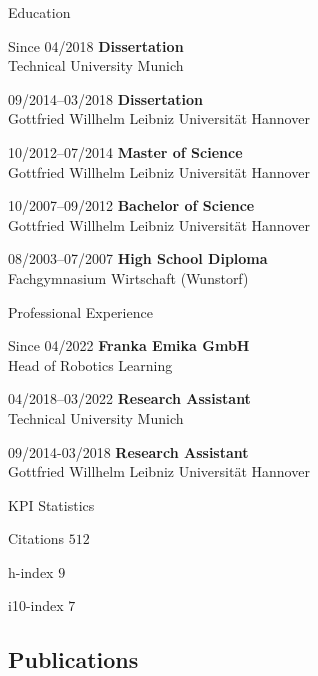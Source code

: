 \begin{cv}{}
\begin{cvlist}{Education}
\item[Since 04/2018] \textbf{Dissertation}\\
Technical University Munich
\item[09/2014--03/2018] \textbf{Dissertation}\\
Gottfried Willhelm Leibniz Universit\"at Hannover
\item[10/2012--07/2014] \textbf{Master of Science}\\
Gottfried Willhelm Leibniz Universit\"at Hannover
\item[10/2007--09/2012] \textbf{Bachelor of Science}\\
Gottfried Willhelm Leibniz Universit\"at Hannover
\item[08/2003--07/2007] \textbf{High School Diploma}\\
Fachgymnasium Wirtschaft (Wunstorf)
\end{cvlist}

\begin{cvlist}{Professional Experience}
\item[Since 04/2022] \textbf{Franka Emika GmbH}\\
Head of Robotics Learning
\item[04/2018--03/2022] \textbf{Research Assistant}\\
Technical University Munich
\item[09/2014-03/2018] \textbf{Research Assistant}\\
Gottfried Willhelm Leibniz Universit\"at Hannover
\end{cvlist}

\begin{cvlist}{KPI Statistics}
    \item[Citations] $512$
    \item[h-index] $9$
    \item[i10-index] $7$
\end{cvlist}

\end{cv}

\subsection*{Publications}

